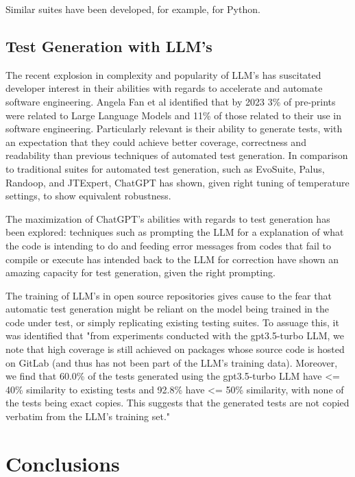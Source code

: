 Similar suites have been developed, for example, for Python. ~\citep{kn:pynguin}

\subsection{Test Generation with LLM's}

The recent explosion in complexity and popularity of LLM's has suscitated developer interest in their abilities with regards to accelerate and automate software engineering. Angela Fan et al identified that by 2023 3\% of pre-prints were related to Large Language Models and 11\% of those related to their use in software engineering.\cite{kn:angela} Particularly relevant is their ability to generate tests, with an expectation that they could achieve better coverage, correctness and readability than previous techniques of automated test generation.\cite{kn:junjiewang}
In comparison to traditional suites for automated test generation, such as EvoSuite, Palus, Randoop, and JTExpert, ChatGPT has shown, given right tuning of temperature settings, to show equivalent robustness.\cite{kn:gptunitbra}


The maximization of ChatGPT's abilities with regards to test generation has been explored: techniques such as prompting the LLM for a explanation of what the code is intending to do \cite{kn:nuances} and feeding error messages from codes that fail to compile or execute has intended back to the LLM for correction \cite{kn:chattester} have shown an amazing capacity for test generation, given the right prompting.

The training of LLM's in open source repositories gives cause to the fear that automatic test generation might be reliant on the model being trained in the code under test, or simply replicating existing testing suites. To assuage this, it was identified that "from experiments conducted with the gpt3.5-turbo LLM, we note that high coverage is still achieved on packages whose source code is hosted on GitLab (and thus has not been part of the LLM’s training data). Moreover, we find that 60.0\% of the tests generated using the gpt3.5-turbo LLM have <= 40\% similarity to existing tests and 92.8\% have <= 50\% similarity, with none of the tests being exact copies. This suggests that the generated tests are not copied
verbatim from the LLM’s training set." \citep{kn:max}


\section{Conclusions}


